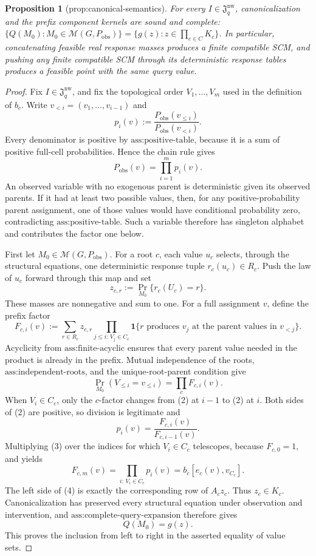 \documentclass{article}
\newtheorem{proposition}{Proposition}
\begin{document}
\begin{proposition}[prop:canonical-semantics]\label{prop:canonical-semantics}
For every \(I\in\mathfrak J_q^{\mathrm{nw}}\), canonicalization and the prefix component kernels are sound and complete: \(\{Q(M_0):M_0\in\mathcal M(G,P_{\mathrm{obs}})\}=\{g(z):z\in\prod_{c\in C}K_c\}\). In particular, concatenating feasible real response masses produces a finite compatible SCM, and pushing any finite compatible SCM through its deterministic response tables produces a feasible point with the same query value.
\end{proposition}
\begin{proof}
Fix \(I\in\mathfrak J_q^{\mathrm{nw}}\), and fix the topological order \(V_1,\ldots,V_m\) used in the definition of \(b_c\).  Write \(v_{<i}=(v_1,\ldots,v_{i-1})\) and
\[
p_i(v):=\frac{P_{\mathrm{obs}}(v_{\le i})}{P_{\mathrm{obs}}(v_{<i})}.
\]
Every denominator is positive by \(\text{ass:positive-table}\), because it is a sum of positive full-cell probabilities.  Hence the chain rule gives
\[
P_{\mathrm{obs}}(v)=\prod_{i=1}^m p_i(v). \tag{1}
\]
An observed variable with no exogenous parent is deterministic given its observed parents.  If it had at least two possible values, then, for any positive-probability parent assignment, one of those values would have conditional probability zero, contradicting \(\text{ass:positive-table}\).  Such a variable therefore has singleton alphabet and contributes the factor one below.

First let \(M_0\in\mathcal M(G,P_{\mathrm{obs}})\).  For a root \(c\), each value \(u_c\) selects, through the structural equations, one deterministic response tuple \(r_c(u_c)\in R_c\).  Push the law of \(u_c\) forward through this map and set
\[
z_{c,r}:=\Pr_{M_0}\{r_c(U_c)=r\}.
\]
These masses are nonnegative and sum to one.  For a full assignment \(v\), define the prefix factor
\[
F_{c,i}(v):=
\sum_{r\in R_c}z_{c,r}
\prod_{j\le i:\,V_j\in C_c}
\mathbf 1\{r\text{ produces }v_j\text{ at the parent values in }v_{<j}\}.
\]
Acyclicity from \(\text{ass:finite-acyclic}\) ensures that every parent value needed in the product is already in the prefix.  Mutual independence of the roots, \(\text{ass:independent-roots}\), and the unique-root-parent condition give
\[
\Pr_{M_0}(V_{\le i}=v_{\le i})=\prod_c F_{c,i}(v). \tag{2}
\]
When \(V_i\in C_c\), only the \(c\)-factor changes from (2) at \(i-1\) to (2) at \(i\).  Both sides of (2) are positive, so division is legitimate and
\[
p_i(v)=\frac{F_{c,i}(v)}{F_{c,i-1}(v)}. \tag{3}
\]
Multiplying (3) over the indices for which \(V_i\in C_c\) telescopes, because \(F_{c,0}=1\), and yields
\[
F_{c,m}(v)=\prod_{i:\,V_i\in C_c}p_i(v)=b_c[e_c(v),v_{C_c}]. \tag{4}
\]
The left side of (4) is exactly the corresponding row of \(A_cz_c\).  Thus \(z_c\in K_c\).  Canonicalization has preserved every structural equation under observation and intervention, and \(\text{ass:complete-query-expansion}\) therefore gives
\[
Q(M_0)=g(z). \tag{5}
\]
This proves the inclusion from left to right in the asserted equality of value sets.


\end{proof}
\end{document}
